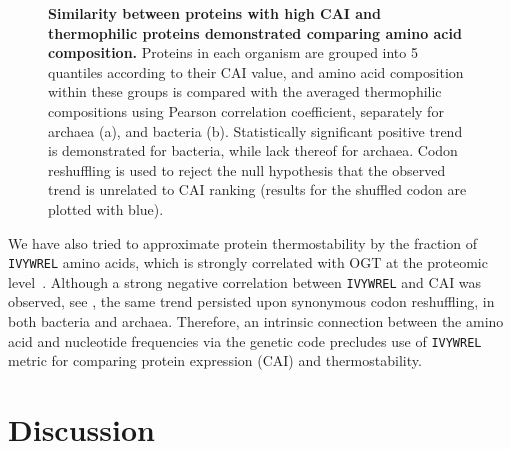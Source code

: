 \documentclass[10pt,letterpaper]{article}
\begin{document}
\begin{figure}[h!]
\caption{
{\bf Similarity between proteins with high CAI and thermophilic proteins demonstrated comparing amino acid composition.}
Proteins in each organism are grouped into 5 quantiles according to their CAI value, and amino acid composition within these groups is compared with the averaged thermophilic compositions using Pearson correlation coefficient, separately for archaea (a), and bacteria (b). Statistically significant positive trend is demonstrated for bacteria, while lack thereof for archaea. Codon reshuffling is used to reject the null hypothesis that the observed trend is unrelated to CAI ranking (results for the shuffled codon are plotted with blue).
}
\label{fig:fig7}
\end{figure}

We have also tried to approximate protein thermostability by the fraction of \texttt{IVYWREL} amino acids, which is strongly correlated with OGT at the proteomic level~\cite{Zeldovich2007Protein}. Although a strong negative correlation between \texttt{IVYWREL} and CAI was observed, see , the same trend persisted upon synonymous codon reshuffling, in both bacteria and archaea. Therefore, an intrinsic connection between the amino acid and nucleotide frequencies via the genetic code precludes use of \texttt{IVYWREL} metric for comparing protein expression (CAI) and thermostability.

\section*{Discussion}

\end{document}
